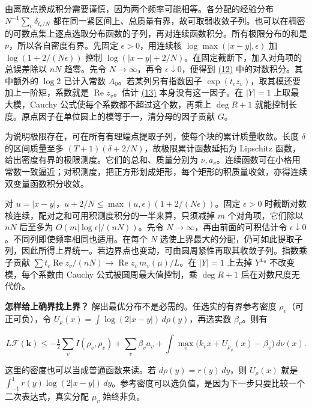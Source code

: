 \documentclass[11pt,a4paper]{article}
\begin{document}
由离散点换成积分需要谨慎，因为两个频率可能相等。各分配的经验分布 \(N^{-1}\sum_c\delta_{t_c/N}\) 都在同一紧区间上、总质量有界，故可取弱收敛子列。也可以在稠密的可数点集上逐点选取分布函数的子列，再对连续函数积分。所有极限分布的和是 \(\nu\)，所以各自密度有界。先固定 \(\epsilon>0\)，用连续核 \(\log\max(|x-y|,\epsilon)\) 加 \(\log(1+2/(N\epsilon))\) 控制 \(\log(|x-y|+2/N)\)。在固定截断下，加入对角项的总误差除以 \(nN\) 趋零。先令 \(N\to\infty\)，再令 \(\epsilon\downarrow0\)，便得到 \hyperref[eq:12]{(12)} 中的对数积分。其中额外的 \(\log2\) 已计入常数 \(A_0\)。若某列另有指数因子 \(\exp(t_cz_v)\)，取其模还要加上一阶矩，系数就是 \(\operatorname{Re}z_v\)。估计 \hyperref[eq:13]{(13)} 本身没有这一因子。在 \(|Y|=1\) 上取最大模，Cauchy 公式使每个系数都不超过这个数，再乘上 \(\deg R+1\) 就能控制长度。原点因子在单位圆上的模等于一，清分母的因子贡献 \(G\)。

为说明极限存在，可在所有有理端点提取子列，使每个块的累计质量收敛。长度 \(\delta\) 的区间质量至多 \((T+1)(\delta+2/N)\)，故极限累计函数延拓为 Lipschitz 函数，给出密度有界的极限测度。它们的总和、质量分别为 \(\nu,a_v\)。连续函数可在小格用常数一致逼近；对积测度，把正方形划成矩形，每个矩形的积质量收敛，亦得连续双变量函数积分收敛。

对 \(u=|x-y|\)，\(u+2/N\le\max(u,\epsilon)(1+2/(N\epsilon))\)。固定 \(\epsilon>0\) 时截断对数核连续，配对之和可用积测度积分的一半来算，只须减掉 \(m\) 个对角项，它们除以 \(nN\) 后至多为 \(O(m|\log\epsilon|/(nN))\)。先令 \(N\to\infty\)，再由前面的可积估计令 \(\epsilon\downarrow0\)。不同列即使频率相同也适用。在每个 \(N\) 选使上界最大的分配，仍可如此提取子列，因此所得上界统一。若边界点也变动，可由圆周紧性再取其收敛子列。指数乘子贡献 \(\sum t_c\operatorname{Re}z_v/(nN)\to\operatorname{Re}z_v\,m_v(\mu)/L\)。在 \(|Y|=1\) 上去掉 \(Y^{L_0}\) 不改变模，每个系数由 Cauchy 公式被圆周最大值控制，乘 \(\deg R+1\) 后在对数尺度无代价。

\textbf{怎样给上确界找上界？} 解出最优分布不是必需的。任选实的有界参考密度 \(\rho_v\)（可正可负），令 \(U_\rho(x)=\int\log(2|x-y|)\,d\rho(y)\)，再选实数 \(\beta_v\)。则有

\[
 L\mathcal F(\mathbf k)\le
 -\tfrac12\sum_v I(\rho_v,\rho_v)+\sum_v\beta_va_v+
 \int\max_v\big(k_vx+U_{\rho_v}(x)-\beta_v\big)\,d\nu(x).                \tag{15}\label{eq:15}
\]

这里的密度也可以当成普通函数来读。若 \(d\rho(y)=r(y)\,dy\)，则 \(U_\rho(x)\) 就是 \(\int_{-1}^1 r(y)\log(2|x-y|)\,dy\)。参考密度可以选负值，是因为下一步只要比较一个二次表达式，真实分配 \(\mu_v\) 始终非负。
\end{document}
